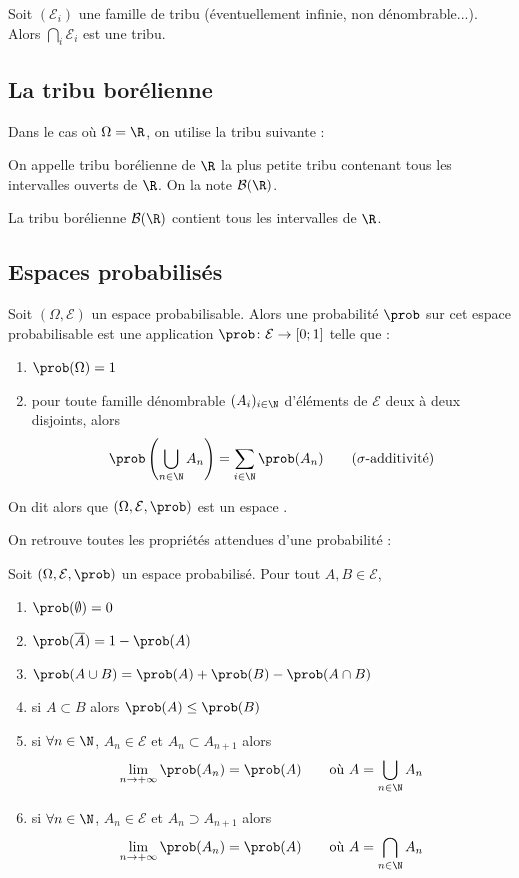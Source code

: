 \begin{proposition}{}{}
	Soit $(\mathcal{E}_i)$ une famille de tribu (éventuellement infinie, non dénombrable...). Alors $\bigcap_i \mathcal{E}_i$ est une tribu.
\end{proposition}
\subsection{La tribu borélienne}
Dans le cas où $\Omega = \R$, on utilise la tribu suivante :

\begin{definition}{}{}
	On appelle tribu borélienne de $\R$ la plus petite tribu contenant tous les intervalles ouverts de $\R$. On la note $\mathcal{B}(\R)$.
\end{definition}

La tribu borélienne $\mathcal{B}(\R)$ contient tous les intervalles de $\R$.

\subsection{Espaces probabilisés}
\begin{definition}{}{}
	Soit $(\Omega,\mathcal{E})$ un espace probabilisable. Alors une probabilité $\prob$ sur cet espace probabilisable est une application $\prob \colon \mathcal{E} \rightarrow [0;1]$ telle que :
		\begin{enumerate}
			\item $\prob(\Omega)=1$
			\item pour toute famille dénombrable $(A_i)_{i \in \N}$ d'éléments de $\mathcal{E}$ deux à deux disjoints, alors
			 $$\prob\left(\bigcup_{n \in \N} A_n \right) = \sum_{i \in \N} \prob(A_n) \qquad \text{($\sigma$-additivité)}$$
			\end{enumerate}
		On dit alors que  $(\Omega,\mathcal{E},\prob)$ est un espace .
\end{definition}

On retrouve toutes les propriétés attendues d'une probabilité :

\begin{proposition}{}{}
 Soit $(\Omega,\mathcal{E},\prob)$  un espace probabilisé. Pour tout $A,B \in \mathcal{E}$, 
\begin{enumerate}
		\item $\prob(\emptyset)=0$
		\item $\prob(\overline{A})=1-\prob(A)$
		\item $\prob(A \cup B) = \prob(A) + \prob(B) - \prob(A \cap B)$
		\item si $A \subset B$ alors $\prob(A) \leq \prob(B)$
		\item si $\forall n \in \N$, $A_n \in \mathcal{E}$ et $A_n \subset A_{n+1}$ alors $$\lim\limits_{n \to +\infty} \prob(A_n) = \prob(A)  \qquad \text{où } A = \bigcup_{n \in \N} A_n$$
		\item si $\forall n \in \N$, $A_n \in \mathcal{E}$ et $A_n \supset A_{n+1}$ alors $$\lim\limits_{n \to +\infty} \prob(A_n) = \prob(A)  \qquad \text{où } A = \bigcap_{n \in \N} A_n$$
\end{enumerate}

\end{proposition}

